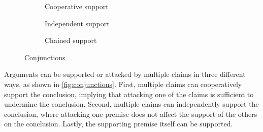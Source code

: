 \begin{figure}[ht!]
    \centering
    \begin{subfigure}[b]{0.3\textwidth}
        \centering
        \caption{Cooperative support}
        \label{fig:linked}
    \end{subfigure}
    \begin{subfigure}[b]{0.3\textwidth}
        \centering
        \caption{Independent support}
        \label{fig:multiple}
    \end{subfigure}
    \begin{subfigure}[b]{.3\textwidth}
        \centering
        \caption{Chained support}
        \label{fig:chained}
    \end{subfigure}
    \caption{Conjunctions}
    \label{fig:conjunctions}
\end{figure}

Arguments can be supported or attacked by multiple claims in three different ways, as shown in \autoref{fig:conjunctions}. First, multiple claims can cooperatively support the conclusion, implying that attacking one of the claims is sufficient to undermine the conclusion. Second, multiple claims can independently support the conclusion, where attacking one premise does not affect the support of the others on the conclusion. Lastly, the supporting premise itself can be supported.

